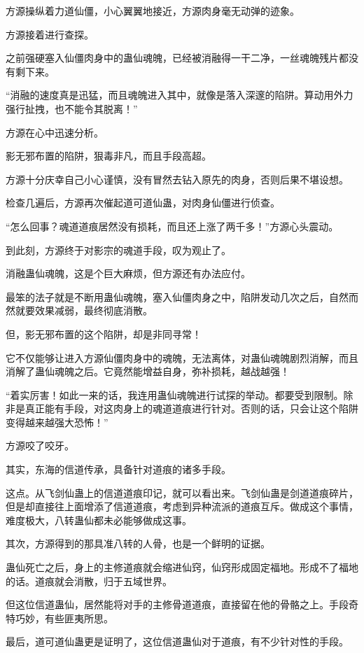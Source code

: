 \begin{this_body}
方源操纵着力道仙僵，小心翼翼地接近，方源肉身毫无动弹的迹象。

方源接着进行查探。

之前强硬塞入仙僵肉身中的蛊仙魂魄，已经被消融得一干二净，一丝魂魄残片都没有剩下来。

“消融的速度真是迅猛，而且魂魄进入其中，就像是落入深邃的陷阱。算动用外力强行扯拽，也不能令其脱离！”

方源在心中迅速分析。

影无邪布置的陷阱，狠毒非凡，而且手段高超。

方源十分庆幸自己小心谨慎，没有冒然去钻入原先的肉身，否则后果不堪设想。

检查几遍后，方源再次催起道可道仙蛊，对肉身仙僵进行侦查。

“怎么回事？魂道道痕居然没有损耗，而且还上涨了两千多！”方源心头震动。

到此刻，方源终于对影宗的魂道手段，叹为观止了。

消融蛊仙魂魄，这是个巨大麻烦，但方源还有办法应付。

最笨的法子就是不断用蛊仙魂魄，塞入仙僵肉身之中，陷阱发动几次之后，自然而然就要效果减弱，最终彻底消散。

但，影无邪布置的这个陷阱，却是非同寻常！

它不仅能够让进入方源仙僵肉身中的魂魄，无法离体，对蛊仙魂魄剧烈消解，而且消解了蛊仙魂魄之后。它竟然能增益自身，弥补损耗，越战越强！

“着实厉害！如此一来的话，我连用蛊仙魂魄进行试探的举动。都要受到限制。除非是真正能有手段，对这肉身上的魂道道痕进行针对。否则的话，只会让这个陷阱变得越来越强大恐怖！”

方源咬了咬牙。

其实，东海的信道传承，具备针对道痕的诸多手段。

这点。从飞剑仙蛊上的信道道痕印记，就可以看出来。飞剑仙蛊是剑道道痕碎片，但是却直接往上面增添了信道道痕，考虑到异种流派的道痕互斥。做成这个事情，难度极大，八转蛊仙都未必能够做成这事。

其次，方源得到的那具准八转的人骨，也是一个鲜明的证据。

蛊仙死亡之后，身上的主修道痕就会缩进仙窍，仙窍形成固定福地。形成不了福地的话。道痕就会消散，归于五域世界。

但这位信道蛊仙，居然能将对手的主修骨道道痕，直接留在他的骨骼之上。手段奇特巧妙，有些匪夷所思。

最后，道可道仙蛊更是证明了，这位信道蛊仙对于道痕，有不少针对性的手段。


\end{this_body}
